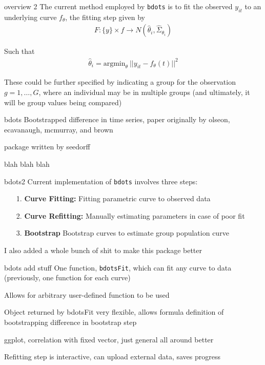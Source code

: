 \documentclass{beamer}
\newcommand{\code}[1]{\texttt{#1}}
\begin{document}
\begin{frame}{overview 2}
The current method employed by \code{bdots} is to fit the observed $y_{it}$ to an underlying curve $f_{\theta}$, the fitting step given by 
  \begin{align*}
  F: \{y\} \times f \rightarrow N \left(\hat{\theta}_i, \hat{\Sigma}_{\theta_i} \right)
  \end{align*}

Such that
  \begin{align*}
  \hat{\theta}_i = \text{argmin}_{\theta} \  ||y_{it} - f_{\theta}(t)||^2
  \end{align*}

These could be further specified by indicating a group for the observation $g = 1, \dots, G$, where an individual may be in multiple groups (and ultimately, it will be group values being compared)
\end{frame}

\begin{frame}{bdots}
Bootstrapped difference in time series, paper originally by olseon, ecavanaugh, mcmurray, and brown \newline

package written by seedorff \newline

blah blah blah
\end{frame}

\begin{frame}{bdots2}
Current implementation of \code{bdots} involves three steps:
\begin{enumerate}
\item[1.] \textbf{Curve Fitting:} Fitting parametric curve to observed data
\item[2.] \textbf{Curve Refitting:} Manually estimating parameters in case of poor fit
\item[3.] \textbf{Bootstrap} Bootstrap curves to estimate group population curve \newline
\end{enumerate}
I also added a whole bunch of shit to make this package better
\end{frame}

\begin{frame}{bdots add stuff}
One function, \code{bdotsFit}, which can fit any curve to data (previously, one function for each curve) \newline 

Allows for arbitrary user-defined function to be used \newline 

Object returned by bdotsFit very flexible, allows formula definition of bootstrapping difference in bootstrap step \newline 

ggplot, correlation with fixed vector, just general all around better

Refitting step is interactive, can upload external data, saves progress \newline 

\end{frame}
\end{document}
